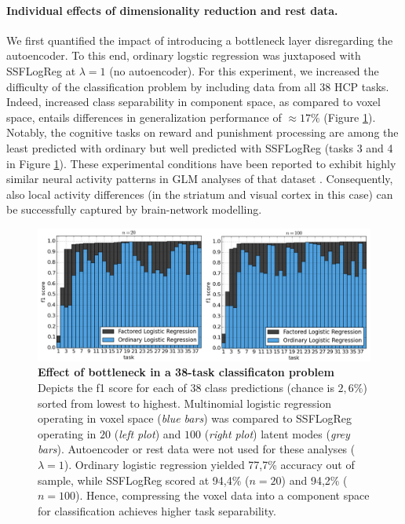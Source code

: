 \documentclass{article} %
\begin{document}
\paragraph{Individual effects of dimensionality reduction and rest data.}
We first quantified the impact of introducing a bottleneck layer
disregarding the autoencoder.
To this end, ordinary logstic regression was juxtaposed
with SSFLogReg  at $\lambda=1$ (no autoencoder).
For this experiment, we increased the difficulty of the classification problem
by including data from all 38 HCP tasks.
Indeed, increased class separability in component space,
as compared to voxel space, entails differences in
generalization performance of
$\approx{17\%}$ (Figure \ref{fig_dimred}).
%
Notably,
the cognitive tasks on reward and punishment processing
are among the least predicted with ordinary but well predicted with
SSFLogReg
(tasks 3 and 4 in Figure \ref{fig_dimred}).
These experimental conditions have been reported to exhibit
highly similar neural activity patterns in
GLM analyses of that dataset \cite{barch2013}.
Consequently, also local activity differences
(in the striatum and visual cortex in this case) can
be successfully captured by brain-network modelling.
%
\begin{figure}
\begin{centering}
\includegraphics[width=1.00\textwidth]{figures/accuracies.pdf}
\end{centering}
\vspace{-0.5cm}
\caption{\textbf{Effect of bottleneck in a 38-task classificaton problem}
Depicts the f1 score for each of 38 class predictions (chance is  $2,6\%$)
sorted from lowest to highest.
Multinomial logistic regression operating in voxel space (\textit{blue bars})
was compared to 
SSFLogReg operating in $20$
(\textit{left plot}) and $100$ (\textit{right plot})
latent modes (\textit{grey bars}).
Autoencoder or rest data were not used for these analyses
($\lambda=1$).
Ordinary logistic regression yielded 77,7\% accuracy out of sample, while
SSFLogReg scored at 94,4\% ($n=20$) and 94,2\% ($n=100$).
Hence, compressing the voxel data into a component space for classification
achieves higher task separability.
}
\label{fig_dimred}
\end{figure}
\end{document}
